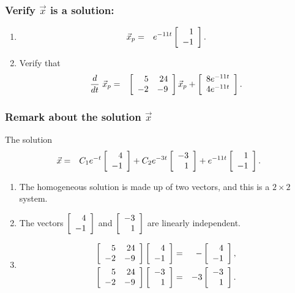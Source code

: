 \begin{frame}
  \frametitle{Verify $\vec{x}$ is a solution:}
  \begin{enumerate}

  \item 
    \begin{eqnarray*}
      \vec{x}_p & = & e^{-11t} \vecTwo{1}{-1}.
    \end{eqnarray*}

  \item  Verify that  
   \begin{eqnarray*}
      \deriv{~}{t} \vec{x}_p & = & \arrayTwo{5}{24}{-2}{-9} \vec{x}_p
        + \vecTwo{8e^{-11t}}{4e^{-11t}}.
    \end{eqnarray*}


  \end{enumerate}

\end{frame}

\begin{frame}
 \frametitle{Remark about the solution $\vec{x}$}
  The solution
   \begin{eqnarray*}
      \vec{x} & = &  
      C_1 e^{-t} \vecTwo{4}{-1} + C_2 e^{-3t} \vecTwo{-3}{1} 
      +  e^{-11t} \vecTwo{1}{-1}.
    \end{eqnarray*}

  \begin{enumerate}

  \item The homogeneous solution is made up of two vectors, and this
    is a $2\times 2$ system.
  \item The vectors $\vecTwo{4}{-1}$ and $\vecTwo{-3}{1}$ are linearly
    independent.
  \item
    \begin{eqnarray*}
      \arrayTwo{5}{24}{-2}{-9} \vecTwo{4}{-1} & = & - \vecTwo{4}{-1}, \\
      \arrayTwo{5}{24}{-2}{-9} \vecTwo{-3}{1} & = & -3 \vecTwo{-3}{1}.
    \end{eqnarray*}
  \end{enumerate}

\end{frame}

